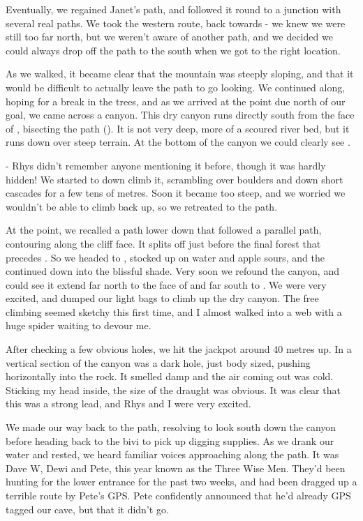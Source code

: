     Eventually, we regained Janet's path, and followed it round to a junction with several real paths. We took the western route, back towards  - we knew we were still too far north, but we weren't aware of another path, and we decided we could always drop off the path to the south when we got to the right location.

    As we walked, it became clear that the mountain was steeply sloping, and that it would be difficult to actually leave the path to go looking. We continued along, hoping for a break in the trees, and as we arrived at the point due north of our goal, we came across a canyon. This dry canyon runs directly south from the face of ,  bisecting the path (). It is not very deep, more of a scoured river bed, but it runs down over steep terrain. At the bottom of the canyon we could clearly see .

	 - Rhys didn't remember anyone mentioning it before, though it was hardly hidden! We started to down climb it, scrambling over boulders and down short cascades for a few tens of metres. Soon it became too steep, and we worried we wouldn't be able to climb back up, so we retreated to the path.

    At the point, we recalled a path lower down that followed a parallel path, contouring along the cliff face. It splits off just before the final forest that precedes . So we headed to , stocked up on water and apple sours, and the continued down into the blissful shade. Very soon we refound the canyon, and could see it extend far north to the face of  and far south to . We were very excited, and dumped our light bags to climb up the dry canyon. The free climbing seemed sketchy this first time, and I almost walked into a web with a huge spider waiting to devour me.

    After checking a few obvious holes, we hit the jackpot around 40 metres up. In a vertical section of the canyon was a dark hole, just body sized, pushing horizontally into the rock. It smelled damp and the air coming out was cold. Sticking my head inside, the size of the draught was obvious. It was clear that this was a strong lead, and Rhys and I were very excited.

    We made our way back to the path, resolving to look south down the canyon before heading back to the bivi to pick up digging supplies. As we drank our water and rested, we heard familiar voices approaching along the path. It was Dave W, Dewi and Pete, this year known as the Three Wise Men. They'd been hunting for the lower entrance for the past two weeks, and had been dragged up a terrible route by Pete's GPS. Pete confidently announced that he'd already GPS tagged our cave, but that it didn't go.

